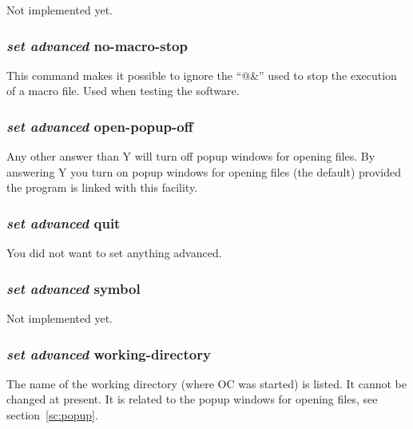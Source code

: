 \documentclass[11pt]{article}
\begin{document}
Not implemented yet.

\hypertarget{Set adv no-macro-stop}{}
\subsubsection{{\em set advanced} no-macro-stop}

This command makes it possible to ignore the ``@\&'' used to stop the
execution of a macro file.  Used when testing the software.

\hypertarget{Set adv open popup}{}
\subsubsection{{\em set advanced} open-popup-off}

Any other answer than Y will turn off popup windows for opening files.
By answering Y you turn on popup windows for opening files (the
default) provided the program is linked with this facility.

\hypertarget{Set adv quit}{}
\subsubsection{{\em set advanced} quit}

You did not want to set anything advanced.

\hypertarget{Set adv symbol}{}
\subsubsection{{\em set advanced} symbol}

Not implemented yet.

\hypertarget{Set adv workdir}{}
\subsubsection{{\em set advanced} working-directory}

The name of the working directory (where OC was started) is listed.
It cannot be changed at present.  It is related to the popup windows
for opening files, see section~\ref{sc:popup}.

\hypertarget{Set as start equil}{}
\end{document}
